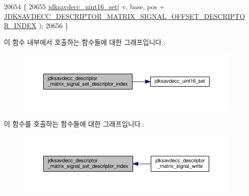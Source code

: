 \begin{DoxyCode}
20654 \{
20655     \hyperlink{group__endian_ga14b9eeadc05f94334096c127c955a60b}{jdksavdecc\_uint16\_set}( v, base, pos + 
      \hyperlink{group__descriptor__matrix__signal_gad878b96f01d040970dd238c7bb1ecad5}{JDKSAVDECC\_DESCRIPTOR\_MATRIX\_SIGNAL\_OFFSET\_DESCRIPTOR\_INDEX}
       );
20656 \}
\end{DoxyCode}


이 함수 내부에서 호출하는 함수들에 대한 그래프입니다.\+:
\nopagebreak
\begin{figure}[H]
\begin{center}
\leavevmode
\includegraphics[width=350pt]{group__descriptor__matrix__signal_gaf0da27eefdf8c74a0fbeef690170032e_cgraph}
\end{center}
\end{figure}




이 함수를 호출하는 함수들에 대한 그래프입니다.\+:
\nopagebreak
\begin{figure}[H]
\begin{center}
\leavevmode
\includegraphics[width=350pt]{group__descriptor__matrix__signal_gaf0da27eefdf8c74a0fbeef690170032e_icgraph}
\end{center}
\end{figure}


